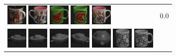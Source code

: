 \begin{figure}[!bp]
\begin{tabular}{m{11cm} | m{3cm} |}
\includegraphics[width=1cm]{coil/beeld-64.eps}
\includegraphics[width=1cm]{coil/beeld-7.eps}
\includegraphics[width=1cm]{coil/beeld-30.eps}
\includegraphics[width=1cm]{coil/beeld-32.eps}
\includegraphics[width=1cm]{coil/beeld-6.eps}
& {\scriptsize 0.0}
\\
\includegraphics[width=1cm]{coil/beeld-24.eps}
\includegraphics[width=1cm]{coil/beeld-25.eps}
\includegraphics[width=1cm]{coil/beeld-27.eps}
\includegraphics[width=1cm]{coil/beeld-28.eps}
\includegraphics[width=1cm]{coil/beeld-26.eps}
\includegraphics[width=1cm]{coil/beeld-50.eps}
\includegraphics[width=1cm]{coil/beeld-48.eps}

\end{tabular}
\end{figure}
